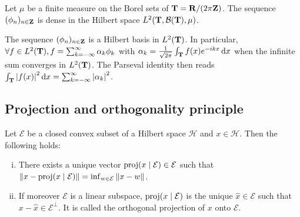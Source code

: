 	\begin{cor}
		Let $\mu$ be a finite measure on the Borel sets of $\mathbf{T} = \mathbf{R} / (2\pi\mathbf{Z})$.
		The sequence $(\phi_n)_{n \in \mathbf{Z}}$ is dense in the Hilbert space $L^2(\mathbf{T}, \mathcal{B}(\mathbf{T}), \mu)$.
	\end{cor}

	\begin{cor}
		The sequence $(\phi_n)_{n \in \mathbf{Z}}$ is a Hilbert basis in $L^2(\mathbf{T})$.
		In particular, $\forall f \in L^2(\mathbf{T}), f = \sum_{k = -\infty}^\infty \alpha_k \phi_k$ with $\alpha_k = \frac{1}{\sqrt{2\pi}} \int_{\mathbf{T}} f(x) e^{-ikx} \mathop{}\mathopen{}\mathrm{d} x$ when the infinite sum converges in $L^2(\mathbf{T})$.
		The Parseval identity then reads $\int_{\mathbf{T}} \left\lvert f(x)\right\rvert^2 \mathop{}\mathopen{}\mathrm{d} x = \sum_{k = -\infty}^\infty \left\lvert\alpha_k\right\rvert^2$.
	\end{cor}


\subsection{Projection and orthogonality principle}

	\begin{thm}
		Let $\mathcal{E}$ be a closed convex subset of a Hilbert space $\mathcal{H}$ and $x \in \mathcal{H}$.
		Then the following holds:
		\begin{enumerate}[(i)]
			\item There exists a unique vector $\operatorname{proj}(x \mid \mathcal{E}) \in \mathcal{E}$ such that $\left\lVert x - \operatorname{proj}(x \mid \mathcal{E})\right\rVert = \inf_{w \in \mathcal{E}} \left\lVert x - w\right\rVert$.
			\item If moreover $\mathcal{E}$ is a linear subspace, $\operatorname{proj}(x \mid \mathcal{E})$ is the unique $\hat{x} \in \mathcal{E}$ such that $x - \hat{x} \in \mathcal{E}^\perp$. It is called the orthogonal projection of $x$ onto $\mathcal{E}$.
		\end{enumerate}
	\end{thm}

